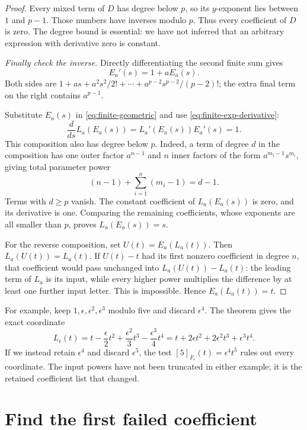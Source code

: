 \documentclass[11pt,letterpaper]{article}
\numberwithin{equation}{section}
\theoremstyle{definition}\newtheorem{example}[theorem]{Example}
\begin{document}
\begin{proof}
Every mixed term of \(D\) has degree below \(p\), so its \(y\)-exponent lies between \(1\) and \(p-1\). Those numbers have inverses modulo \(p\). Thus every coefficient of \(D\) is zero. The degree bound is essential: we have not inferred that an arbitrary expression with derivative zero is constant.

\emph{Finally check the inverse.} Directly differentiating the second finite sum gives
\begin{equation}\label{eq:finite-exp-derivative}
 E_a'(s)=1+aE_a(s).
\end{equation}
Both sides are \(1+as+a^2s^2/2!+\cdots+a^{p-2}s^{p-2}/(p-2)!\); the extra final term on the right contains \(a^{p-1}\).

Substitute \(E_a(s)\) in \eqref{eq:finite-geometric} and use \eqref{eq:finite-exp-derivative}:
\[
 \frac{d}{ds}L_a(E_a(s))
 =L_a'(E_a(s))E_a'(s)=1.
\]
This composition also has degree below \(p\). Indeed, a term of degree \(d\) in the composition has one outer factor \(a^{n-1}\) and \(n\) inner factors of the form \(a^{m_i-1}s^{m_i}\), giving total parameter power
\[
 (n-1)+\sum_{i=1}^{n}(m_i-1)=d-1.
\]
Terms with \(d\ge p\) vanish. The constant coefficient of \(L_a(E_a(s))\) is zero, and its derivative is one. Comparing the remaining coefficients, whose exponents are all smaller than \(p\), proves \(L_a(E_a(s))=s\).

For the reverse composition, set \(U(t)=E_a(L_a(t))\). Then \(L_a(U(t))=L_a(t)\). If \(U(t)-t\) had its first nonzero coefficient in degree \(n\), that coefficient would pass unchanged into \(L_a(U(t))-L_a(t)\): the leading term of \(L_a\) is its input, while every higher power multiplies the difference by at least one further input letter. This is impossible. Hence \(E_a(L_a(t))=t\).
\end{proof}

For example, keep \(1,\epsilon,\epsilon^2,\epsilon^3\) modulo five and discard \(\epsilon^4\). The theorem gives the exact coordinate
\[
 L_\epsilon(t)=t-\frac{\epsilon}{2}t^2
 +\frac{\epsilon^2}{3}t^3-\frac{\epsilon^3}{4}t^4
 =t+2\epsilon t^2+2\epsilon^2t^3+\epsilon^3t^4.
\]
If we instead retain \(\epsilon^4\) and discard \(\epsilon^5\), the test \([5]_{F_\epsilon}(t)=\epsilon^4t^5\) rules out every coordinate. The input powers have not been truncated in either example; it is the retained coefficient list that changed.

\section{Find the first failed coefficient}\label{sec:first-obstruction}
\end{document}
